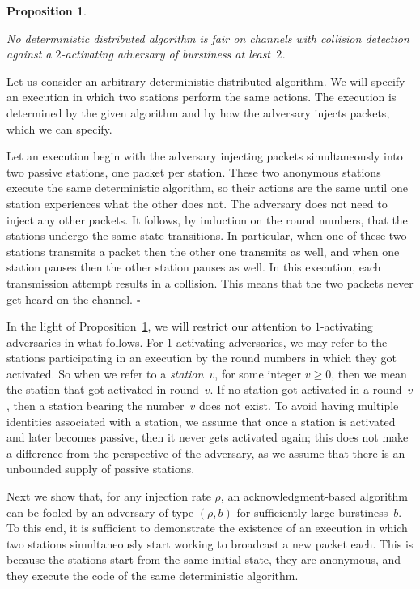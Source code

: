 \documentclass[11pt]{article}
\newcommand{\qed}{\hfill $\square$ \smallbreak}
\newenvironment{proof}{\noindent{\bf Proof:}}{\qed}
\newtheorem{proposition}{Proposition}
\begin{document}
\begin{proposition}
\label{proposition:2-activating}

No deterministic distributed algorithm is fair on channels with collision detection against a $2$-activating adversary of burstiness at least~$2$.
\end{proposition}

\begin{proof} 
Let us consider an arbitrary deterministic distributed algorithm.
We will specify an execution in which two stations perform the same actions.
The execution is determined by the given algorithm and by how the adversary injects packets, which we can specify.

Let an execution begin with the adversary injecting packets simultaneously into two passive stations, one packet per station.
These two anonymous stations execute the same deterministic algorithm, so their actions are the same until one station experiences what the other does not.
The adversary does not need to inject any other packets.
It follows, by induction on the round numbers, that the stations undergo the same state transitions.
In particular, when one of these two stations transmits a packet then the other one transmits as well, and when one station pauses then the other station pauses as well.
In this execution, each transmission attempt results in a collision.
This means that the two packets never get heard on the channel.
\end{proof}

In the light of Proposition~\ref{proposition:2-activating}, we will restrict our attention to $1$-activating adversaries in what follows.
For $1$-activating adversaries, we may refer to the stations participating in an execution by the round numbers in which they got activated.
So when we refer to a \emph{station~$v$}, for some integer $v\ge 0$, then we mean the station that got activated in round~$v$.
If no station got activated in a round~$v$, then a station bearing the number~$v$ does not exist.
To avoid having multiple identities associated with a station, we assume that once a station is activated and later becomes passive, then it never gets activated again; this does not make a difference from the perspective of the adversary, as we assume that there is an unbounded supply of passive stations.

Next we show that, for any injection rate $\rho$, an acknowledgment-based algorithm can be fooled by an adversary of type $(\rho,b)$ for sufficiently large burstiness~$b$.
To this end, it is sufficient to demonstrate the existence of an execution in which two stations simultaneously start working to broadcast a new packet each.
This is because the stations start from the same initial state, they are anonymous, and they  execute the code of the same deterministic algorithm.
\end{document}

